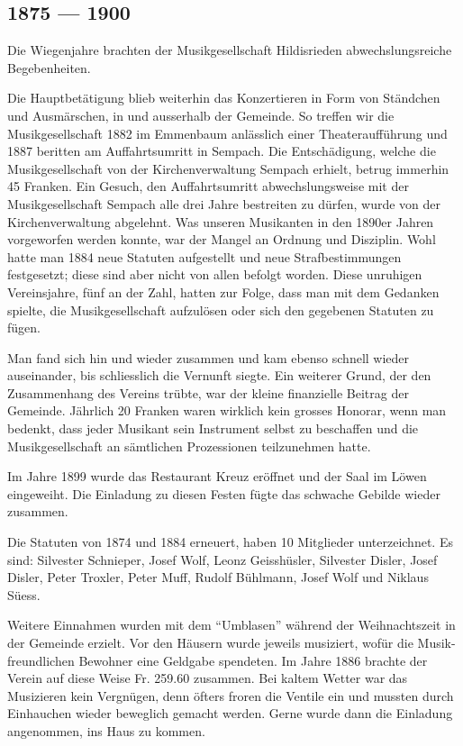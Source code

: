 \begin{multicols}{2}

    \subsection{1875 — 1900}

    Die Wiegenjahre brachten der Musikgesellschaft Hildisrieden
    abwechslungsreiche Begebenheiten.

    Die Hauptbetätigung blieb weiterhin das Konzertieren in Form von Ständchen
    und Ausmärschen, in und ausserhalb der Gemeinde. So treffen wir die
    Musikgesellschaft 1882 im Emmenbaum anlässlich einer Theateraufführung und
    1887 beritten am Auffahrtsumritt in Sempach. Die Entschädigung, welche die
    Musikgesellschaft von der Kirchenverwaltung Sempach erhielt, betrug immerhin
    45 Franken. Ein Gesuch, den Auffahrtsumritt abwechslungsweise mit der
    Musikgesellschaft Sempach alle drei Jahre bestreiten zu dürfen, wurde von
    der Kirchenverwaltung abgelehnt. Was unseren Musikanten in den 1890er Jahren
    vorgeworfen werden konnte, war der Mangel an Ordnung    und Disziplin. Wohl
    hatte man 1884 neue Statuten aufgestellt und neue Strafbestimmungen
    festgesetzt; diese sind aber nicht von allen befolgt worden. Diese unruhigen
    Vereinsjahre, fünf an der Zahl, hatten zur Folge, dass man mit dem Gedanken
    spielte, die Musikgesellschaft aufzulösen oder sich den gegebenen Statuten
    zu fügen.

    Man fand sich hin und wieder zusammen und kam ebenso schnell wieder
    auseinander, bis schliesslich die Vernunft siegte. Ein weiterer Grund, der
    den Zusammenhang des Vereins trübte, war der kleine finanzielle Beitrag der
    Gemeinde. Jährlich 20 Franken waren wirklich kein grosses Honorar, wenn man
    bedenkt, dass jeder Musikant sein Instrument selbst zu beschaffen und die
    Musikgesellschaft an sämtlichen Prozessionen teilzunehmen hatte.

    Im Jahre 1899 wurde das Restaurant Kreuz eröffnet und der Saal im Löwen
    eingeweiht. Die Einladung zu diesen Festen fügte das schwache Gebilde wieder
    zusammen.

    Die Statuten von 1874 und 1884 erneuert, haben 10 Mitglieder unterzeichnet.
    Es sind: Silvester Schnieper, Josef Wolf, Leonz Geisshüsler, Silvester
    Disler, Josef Disler, Peter Troxler, Peter Muff, Rudolf Bühlmann, Josef Wolf
    und Niklaus Süess.

    Weitere Einnahmen wurden mit dem "`Umblasen"'  während der Weihnachtszeit in
    der Gemeinde erzielt. Vor den Häusern wurde jeweils musiziert, wofür die
    Musik-freundlichen Bewohner eine Geldgabe spendeten. Im Jahre 1886 brachte
    der Verein auf diese Weise Fr. 259.60 zusammen. Bei kaltem Wetter war das
    Musizieren kein Vergnügen, denn öfters froren die Ventile ein und mussten
    durch Einhauchen wieder beweglich gemacht werden. Gerne wurde dann die
    Einladung angenommen, ins Haus zu kommen.


\end{multicols}
